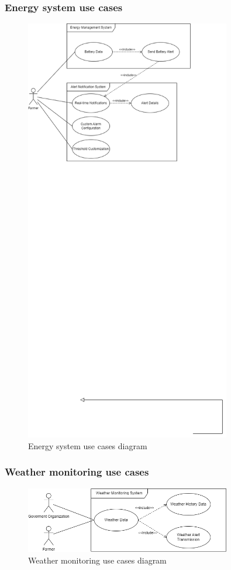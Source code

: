 \subsubsection*{Energy system use cases}
\begin{figure}[H]
    \centering
    \includegraphics[width=0.8\textwidth]{./images/6/energy.png}
    \caption{Energy system use cases diagram}
\end{figure}

\subsubsection*{Weather monitoring use cases}
\begin{figure}[H]
    \centering
    \includegraphics[width=0.8\textwidth]{./images/6/weather_uses.png}
    \caption{Weather monitoring use cases diagram}
\end{figure}
